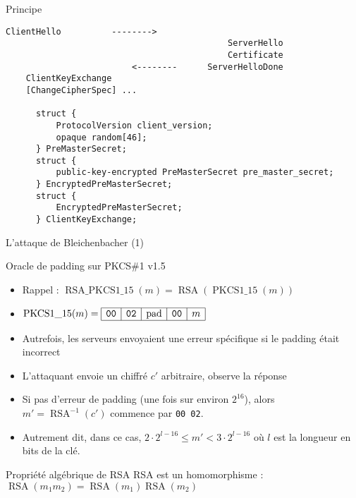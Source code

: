 \documentclass{mpg-ep-slides}
\DeclareMathOperator\RSA{RSA}
\DeclareMathOperator\RSAPKCS{RSA\_PKCS1\_15}
\DeclareMathOperator\PKCS{PKCS1\_15}
\begin{document}
\begin{frame}[containsverbatim]{Principe}
  \begin{Verbatim}[gobble=4, fontsize=\small]
    ClientHello          -------->
                                            ServerHello
                                            Certificate
                         <--------      ServerHelloDone
    ClientKeyExchange
    [ChangeCipherSpec] ...

      struct {
          ProtocolVersion client_version;
          opaque random[46];
      } PreMasterSecret;
      struct {
          public-key-encrypted PreMasterSecret pre_master_secret;
      } EncryptedPreMasterSecret;
      struct {
          EncryptedPreMasterSecret;
      } ClientKeyExchange;
  \end{Verbatim}
\end{frame}

\begin{frame}{L'attaque de Bleichenbacher (1)}
  \begin{block}{Oracle de padding sur PKCS\#1 v1.5}
    \begin{itemize}
      \item Rappel : $\RSAPKCS(m) =
        \RSA(\PKCS(m))$
      \item \(
          \PKCS(m) =
          \begin{array}{|c|c|c|c|c|} \hline
            \texttt{00} & \texttt{02} & \text{pad} & \texttt{00} & m \\ \hline
          \end{array}
        \)
      \item Autrefois, les serveurs envoyaient une erreur spécifique si le
        padding était incorrect
      \item L'attaquant envoie un chiffré $c'$ arbitraire, observe la réponse
      \item Si pas d'erreur de padding (une fois sur environ $2^{16}$), alors
        $m' = \RSA^{-1}(c')$ commence par \texttt{00 02}.
      \item Autrement dit, dans ce cas,
        $2 \cdot 2^{l-16} \le m' < 3 \cdot 2^{l-16}$
        où $l$ est la longueur en bits de la clé.
    \end{itemize}
  \end{block}

  \begin{block}{Propriété algébrique de RSA}
    RSA est un homomorphisme : $\RSA(m_1 m_2) = \RSA(m_1) \RSA(m_2)$
  \end{block}
\end{frame}
\end{document}
